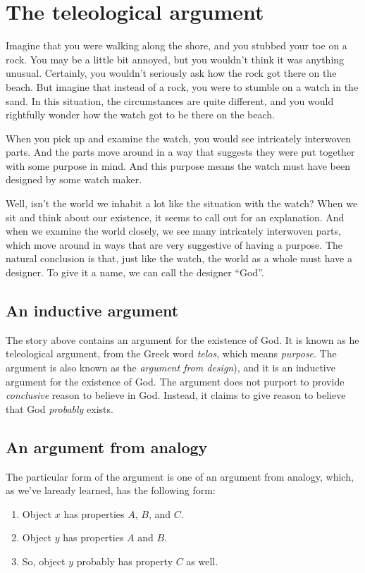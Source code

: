 \documentclass[letterpaper,10pt]{article}
\begin{document}
\section{The teleological argument}

Imagine that you were walking along the shore, and you stubbed your toe on a rock. You may be a little bit annoyed, but you wouldn't think it was anything unusual.  Certainly, you wouldn't seriously ask how the rock got there on the beach. But imagine that instead of a rock, you were to stumble on a watch in the sand. In this situation, the circumstances are quite different, and you would rightfully wonder how the watch got to be there on the beach. 

When you pick up and examine the watch, you would see intricately interwoven parts.  And the parts move around in a way that suggests they were put together with some purpose in mind.  And this purpose means the watch must have been designed by some watch maker.

Well, isn't the world we inhabit a lot like the situation with the watch? When we sit and think about our existence, it seems to call out for an explanation. And when we examine the world closely, we see many intricately interwoven parts, which move around in ways that are very suggestive of having a purpose.  The natural conclusion is that, just like the watch, the world as a whole must have a designer.  To give it a name, we can call the designer ``God''.

\subsection{An inductive argument}

The story above contains an argument for the existence of God. It is known as he teleological argument, from the Greek word \textit{telos}, which means \textit{purpose}. The argument is also known as the \textit{argument from design}), and it is an inductive argument for the existence of God. The argument does not purport to provide \textit{conclusive} reason to believe in God.  Instead, it claims to give reason to believe that God \textit{probably} exists.

\subsection{An argument from analogy}
The particular form of the argument is one of an argument from analogy, which, as we've laready learned, has the following form:
\begin{enumerate}
 \item Object $x$ has properties $A$, $B$, and $C$.
 \item Object $y$ has properties $A$ and $B$.
 \item So, object $y$ probably has property $C$ as well.
\end{enumerate}
\end{document}

